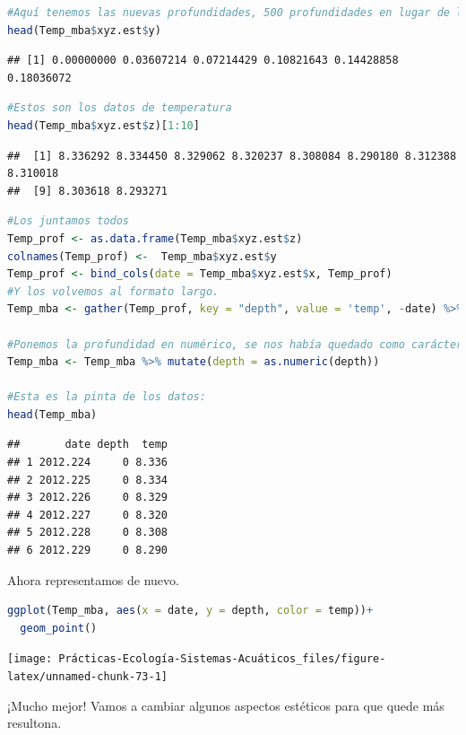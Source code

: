 \documentclass[
]{book}
\begin{document}
\begin{lstlisting}[language=R]
#Aquí tenemos las nuevas profundidades, 500 profundidades en lugar de las 19 que teniamos antes
head(Temp_mba$xyz.est$y)
\end{lstlisting}

\begin{lstlisting}
## [1] 0.00000000 0.03607214 0.07214429 0.10821643 0.14428858 0.18036072
\end{lstlisting}

\begin{lstlisting}[language=R]
#Estos son los datos de temperatura
head(Temp_mba$xyz.est$z)[1:10]
\end{lstlisting}

\begin{lstlisting}
##  [1] 8.336292 8.334450 8.329062 8.320237 8.308084 8.290180 8.312388 8.310018
##  [9] 8.303618 8.293271
\end{lstlisting}

\begin{lstlisting}[language=R]
#Los juntamos todos
Temp_prof <- as.data.frame(Temp_mba$xyz.est$z)
colnames(Temp_prof) <-  Temp_mba$xyz.est$y
Temp_prof <- bind_cols(date = Temp_mba$xyz.est$x, Temp_prof)
#Y los volvemos al formato largo.
Temp_mba <- gather(Temp_prof, key = "depth", value = 'temp', -date) %>%  mutate(temp = round(temp, 3))

#Ponemos la profundidad en numérico, se nos había quedado como carácter
Temp_mba <- Temp_mba %>% mutate(depth = as.numeric(depth))

#Esta es la pinta de los datos:
head(Temp_mba)
\end{lstlisting}

\begin{lstlisting}
##       date depth  temp
## 1 2012.224     0 8.336
## 2 2012.225     0 8.334
## 3 2012.226     0 8.329
## 4 2012.227     0 8.320
## 5 2012.228     0 8.308
## 6 2012.229     0 8.290
\end{lstlisting}

Ahora representamos de nuevo.

\begin{lstlisting}[language=R]
ggplot(Temp_mba, aes(x = date, y = depth, color = temp))+
  geom_point()
\end{lstlisting}

\texttt{[image: Prácticas-Ecología-Sistemas-Acuáticos\_files/figure-latex/unnamed-chunk-73-1]}

¡Mucho mejor! Vamos a cambiar algunos aspectos estéticos para que quede más resultona.
\end{document}
